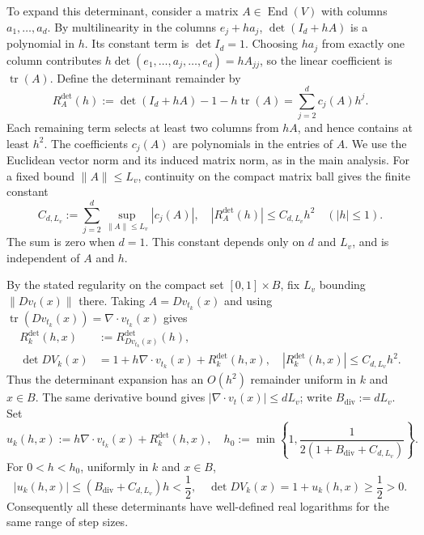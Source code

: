\documentclass[12pt,a4paper,oneside]{book}
\begin{document}
To expand this determinant, consider a matrix $A\in\operatorname{End}(V)$ with columns $a_1,\ldots,a_d$. By multilinearity
in the columns $e_j+ha_j$, $\det(I_d+hA)$ is a polynomial in $h$. Its constant term is $\det I_d=1$. Choosing $ha_j$ from
exactly one column contributes $h\det(e_1,\ldots,a_j,\ldots,e_d)=hA_{jj}$, so the linear coefficient is $\operatorname{tr}(A)$.
Define the determinant remainder by
\begin{equation*}
    R_A^{\det}(h) := \det(I_d+hA)-1-h\operatorname{tr}(A) = \sum_{j=2}^d c_j(A)h^j.
\end{equation*}
Each remaining term selects at least two columns from $hA$, and hence contains at least $h^2$.
The coefficients $c_j(A)$ are polynomials in the entries of $A$.
We use the Euclidean vector norm and its induced matrix norm, as in the main analysis.
For a fixed bound $\|A\|\le L_v$, continuity on the compact matrix ball gives the finite constant
\begin{equation*}
    C_{d,L_v}:=\sum_{j=2}^d\sup_{\|A\|\le L_v}|c_j(A)|,
    \quad |R_A^{\det}(h)|\le C_{d,L_v}h^2\quad (|h|\le1).
\end{equation*}
The sum is zero when $d=1$. This constant depends only on $d$ and $L_v$, and is independent of $A$ and $h$.

By the stated regularity on the compact set $[0,1]\times B$, fix $L_v$ bounding $\|Dv_t(x)\|$ there.
Taking $A=Dv_{t_k}(x)$ and using $\operatorname{tr}(Dv_{t_k}(x))=\nabla\cdot v_{t_k}(x)$ gives
\begin{equation*}
    \begin{aligned}
        R_k^{\det}(h,x)&:=R_{Dv_{t_k}(x)}^{\det}(h),\\
        \det DV_k(x)&=1+h\nabla\cdot v_{t_k}(x)+R_k^{\det}(h,x),
        \quad |R_k^{\det}(h,x)|\le C_{d,L_v}h^2.
    \end{aligned}
\end{equation*}
Thus the determinant expansion has an $O(h^2)$ remainder uniform in $k$ and $x\in B$.
The same derivative bound gives $|\nabla\cdot v_t(x)|\le dL_v$; write $B_{\mathrm{div}}:=dL_v$.
Set
\begin{equation*}
    u_k(h,x):=h\nabla\cdot v_{t_k}(x)+R_k^{\det}(h,x),
    \quad h_0:=\min\left\{1,\frac{1}{2(1+B_{\mathrm{div}}+C_{d,L_v})}\right\}.
\end{equation*}
For $0<h<h_0$, uniformly in $k$ and $x\in B$,
\begin{equation*}
    |u_k(h,x)|\le(B_{\mathrm{div}}+C_{d,L_v})h<\frac12,
    \quad \det DV_k(x)=1+u_k(h,x)\ge\frac12>0.
\end{equation*}
Consequently all these determinants have well-defined real logarithms for the same range of step sizes.
\end{document}
